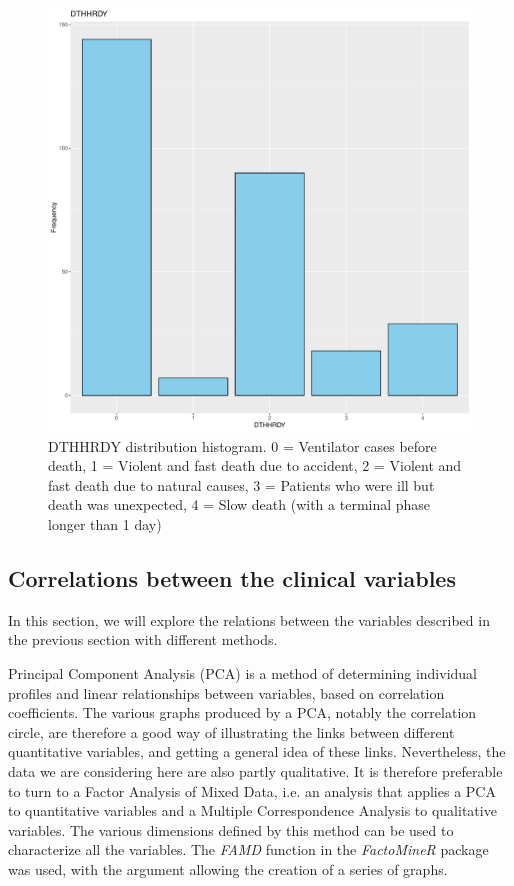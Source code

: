 \documentclass[a4paper, 11pt]{article}
\begin{document}
\begin{multicols}{2}
\begin{figure}[H]
	\centering
	\includegraphics[width=\columnwidth]{figures/clinical_data_var_dist/DTHHRDY}
	\caption{DTHHRDY distribution histogram. 0 = Ventilator cases before death, 1 = Violent and fast death due to accident, 2 = Violent and fast death due to natural causes, 3 = Patients who were ill but death was unexpected, 4 = Slow death (with a terminal phase longer than 1 day)}
	\label{fig:dthhrdyDistrib}
\end{figure}

\subsection{Correlations between the clinical variables}

In this section, we will explore the relations between the variables described in the previous section with different methods.

Principal Component Analysis (PCA) is a method of determining individual profiles and linear relationships between variables, based on correlation coefficients. 
The various graphs produced by a PCA, notably the correlation circle, are therefore a good way of illustrating the links between different quantitative variables, and getting a general idea of these links. 
Nevertheless, the data we are considering here are also partly qualitative. It is therefore preferable to turn to a Factor Analysis of Mixed Data, i.e. an analysis that applies a PCA to quantitative variables and a Multiple Correspondence Analysis to qualitative variables. 
The various dimensions defined by this method can be used to characterize all the variables. The \textit{FAMD} function in the \textit{FactoMineR} package was used, with the argument allowing the creation of a series of graphs.


\end{multicols}
\end{document}
